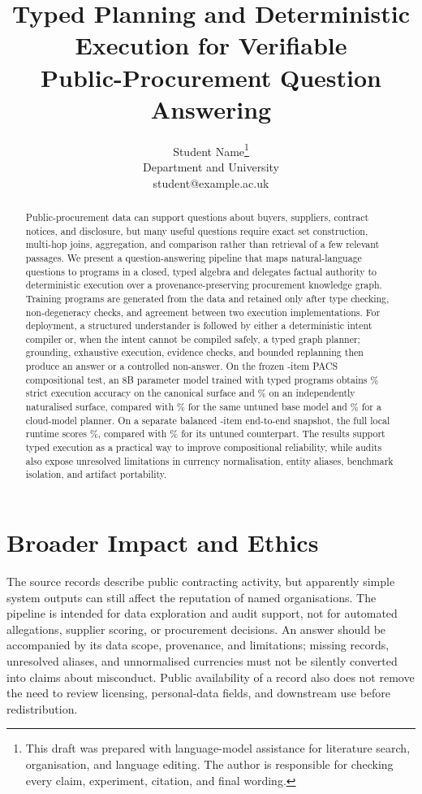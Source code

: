 \documentclass{article}
\title{Typed Planning and Deterministic Execution for Verifiable\\
Public-Procurement Question Answering}
\author{%
  \name Student Name\thanks{This draft was prepared with language-model assistance for
  literature search, organisation, and language editing.  The author is responsible for
  checking every claim, experiment, citation, and final wording.}\\
  \addr Department and University\\
  \email student@example.ac.uk
}
\begin{document}
\maketitle

\begin{abstract}
Public-procurement data can support questions about buyers, suppliers, contract notices,
and disclosure, but many useful questions require exact set construction, multi-hop joins,
aggregation, and comparison rather than retrieval of a few relevant passages.  We present a
question-answering pipeline that maps natural-language questions to programs in a closed,
typed algebra and delegates factual authority to deterministic execution over a
provenance-preserving procurement knowledge graph.  Training programs are generated from the
data and retained only after type checking, non-degeneracy checks, and agreement between two
execution implementations.  For deployment, a structured understander is followed by either a
deterministic intent compiler or, when the intent cannot be compiled safely, a typed graph
planner; grounding, exhaustive execution, evidence checks, and bounded replanning then produce
an answer or a controlled non-answer.  On the frozen \PacsN{}-item PACS compositional test, an
8B parameter model trained with typed programs obtains \PacsOursA\% strict execution accuracy
on the canonical surface and \PacsOursB\% on an independently naturalised surface, compared
with \PacsBaseA\% for the same untuned base model and \PacsTeacherA\% for a cloud-model
planner.  On a separate balanced \RuntimeN{}-item end-to-end snapshot, the full local runtime
scores \RuntimeOurs\%, compared with \RuntimeBase\% for its untuned counterpart.  The results
support typed execution as a practical way to improve compositional reliability, while audits
also expose unresolved limitations in currency normalisation, entity aliases, benchmark
isolation, and artifact portability.
\end{abstract}











\section*{Broader Impact and Ethics}
The source records describe public contracting activity, but apparently simple system outputs
can still affect the reputation of named organisations.  The pipeline is intended for data
exploration and audit support, not for automated allegations, supplier scoring, or procurement
decisions.  An answer should be accompanied by its data scope, provenance, and limitations;
missing records, unresolved aliases, and unnormalised currencies must not be silently converted
into claims about misconduct.  Public availability of a record also does not remove the need to
review licensing, personal-data fields, and downstream use before redistribution.




\appendix





\end{document}
